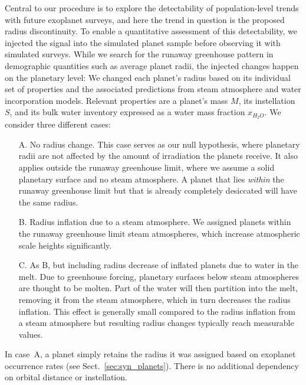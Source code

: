 \documentclass[modern]{aastex631}
\begin{document}
    Central to our procedure is to explore the detectability of population-level trends with future exoplanet surveys, and here the trend in question is the proposed radius discontinuity.
    To enable a quantitative assessment of this detectability, we injected the signal into the simulated planet sample before observing it with simulated surveys.
    While we search for the runaway greenhouse pattern in demographic quantities such as average planet radii, the injected changes happen on the planetary level: We changed each planet's radius based on its individual set of properties and the associated predictions from steam atmosphere and water incorporation models.
    Relevant properties are a planet's mass $M$, its instellation $S$, and its bulk water inventory expressed as a water mass fraction $x_{H_2O}$.
    We consider three different cases:
    \begin{itemize}
   \item[A.] No radius change.
    This case serves as our null hypothesis, where planetary radii are not affected by the amount of irradiation the planets receive.
    It also applies outside the runaway greenhouse limit, where we assume a solid planetary surface and no steam atmosphere.
        A planet that lies \textit{within} the runaway greenhouse limit but that is already completely desiccated will have the same radius. 
   \item[B.] Radius inflation due to a steam atmosphere.
    We assigned planets within the runaway greenhouse limit steam atmospheres, which increase atmospheric scale heights significantly.
   \item[C.] As B, but including radius decrease of inflated planets due to water in the melt.
    Due to greenhouse forcing, planetary surfaces below steam atmospheres are thought to be molten.
    Part of the water will then partition into the melt, removing it from the steam atmosphere, which in turn decreases the radius inflation.
    This effect is generally small compared to the radius inflation from a steam atmosphere but resulting radius changes typically reach measurable values.
    \end{itemize}


In case~A, a planet simply retains the radius it was assigned based on exoplanet occurrence rates (see Sect.~\ref{sec:syn_planets}).
There is no additional dependency on orbital distance or instellation.
\end{document}
